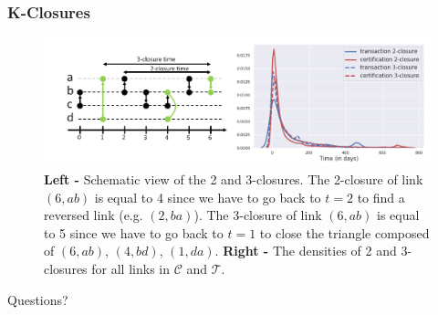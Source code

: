 \documentclass{beamer}
\begin{document}
\begin{frame}
	\frametitle{K-Closures}
	\begin{figure}
		\includegraphics[width=\linewidth]{./figures/triadic_closure}
		\caption{\textbf{Left -} Schematic view of the 2 and 3-closures. The 2-closure of link $\left(6, ab \right)$ is equal to 4 since we have to go back to $t = 2$ to find a reversed link (e.g. $\left(2, ba \right)$). The 3-closure of link $\left(6, ab \right)$ is equal to 5 since we have to go back to $t = 1$ to close the triangle composed of $\left(6, ab\right)$, $\left(4, bd \right)$, $\left(1, da\right)$. \textbf{Right -} The densities of 2 and 3-closures for all links in $\mathcal{C}$ and $\mathcal{T}$.}
	\end{figure}
\end{frame}


\begin{frame}
	\Huge{\centerline{Questions?}}
\end{frame}

\end{document}
